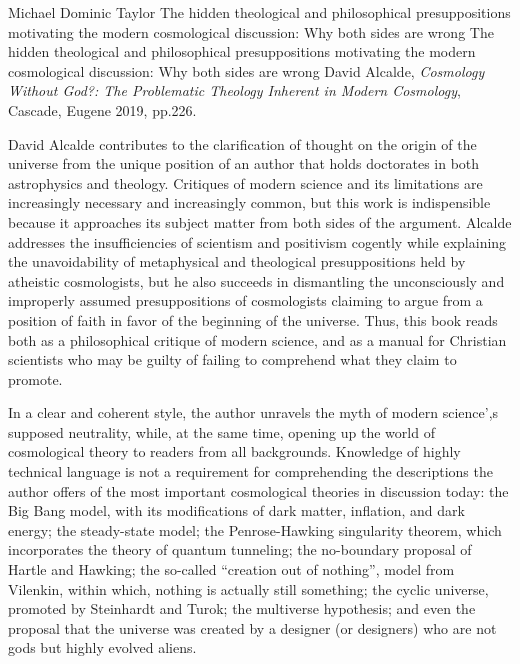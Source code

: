\begin{recengenv}{Michael Dominic Taylor}
	{The hidden theological and philosophical presuppositions motivating the modern cosmological discussion: Why both sides are wrong}
	{The hidden theological and philosophical presuppositions motivating the modern cosmological discussion: Why both sides are wrong}
	{David Alcalde, \textit{Cosmology Without God?: The Problematic Theology Inherent in Modern Cosmology}, Cascade, Eugene 2019, pp.226.}





David Alcalde contributes to the clarification of thought on the origin of the universe from the unique position of an author that holds doctorates in both astrophysics and theology. Critiques of modern science and its limitations are increasingly necessary and increasingly common, but this work is indispensible because it approaches its subject matter from both sides of the argument. Alcalde addresses the insufficiencies of scientism and positivism cogently while explaining the unavoidability of metaphysical and theological presuppositions held by atheistic cosmologists, but he also succeeds in dismantling the unconsciously and improperly assumed presuppositions of cosmologists claiming to argue from a position of faith in favor of the beginning of the universe. Thus, this book reads both as a philosophical critique of modern science, and as a manual for Christian scientists who may be guilty of failing to comprehend what they claim to promote.

In a clear and coherent style, the author unravels the myth of modern science',s supposed neutrality, while, at the same time, opening up the world of cosmological theory to readers from all backgrounds. Knowledge of highly technical language is not a requirement for comprehending the descriptions the author offers of the most important cosmological theories in discussion today: the Big Bang model, with its modifications of dark matter, inflation, and dark energy; the steady-state model; the Penrose-Hawking singularity theorem, which incorporates the theory of quantum tunneling; the no-boundary proposal of Hartle and Hawking; the so-called “creation out of nothing'', model from Vilenkin, within which, nothing is actually still something; the cyclic universe, promoted by Steinhardt and Turok; the multiverse hypothesis; and even the proposal that the universe was created by a designer (or designers) who are not gods but highly evolved aliens.


\end{recengenv}
